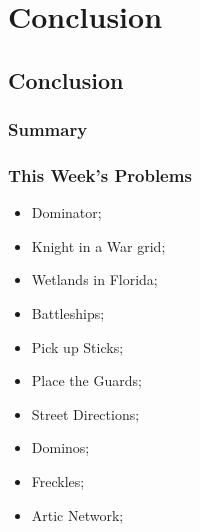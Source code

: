 \documentclass{beamer}
\begin{document}






\section{Conclusion}
\subsection{Conclusion}
\begin{frame}
  \frametitle{Summary}
\end{frame}

\begin{frame}
  \frametitle{This Week's Problems}
  \begin{itemize}
  \item Dominator;
  \item Knight in a War grid;
  \item Wetlands in Florida;
  \item Battleships;
  \item Pick up Sticks;
  \item Place the Guards;
  \item Street Directions;
  \item Dominos;
  \item Freckles;
  \item Artic Network;
  \end{itemize}
\end{frame}
\end{document}
